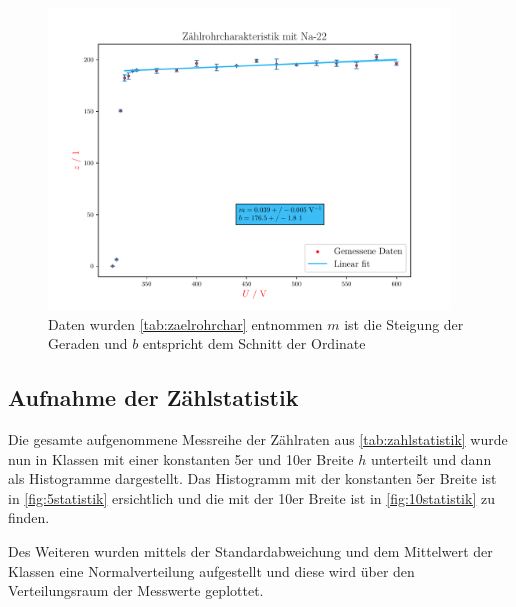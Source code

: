\documentclass[12pt,english,ngerman]{scrartcl}
\begin{document}
\begin{figure}[H]
  \begin{center}
    \includegraphics[width = 0.95\textwidth]{figures/charakteristik.pdf}
  \end{center}
  \caption{Daten wurden \autoref{tab:zaelrohrchar} entnommen 
  $m$ ist die Steigung der Geraden und $b$ entspricht dem Schnitt der Ordinate}
  \label{fig:zaelrohrchar}
\end{figure}


\subsection{Aufnahme der Zählstatistik}

Die gesamte aufgenommene Messreihe der Zählraten aus
\autoref{tab:zahlstatistik} wurde nun in Klassen mit einer konstanten 5er und
10er Breite $h$ unterteilt und dann als Histogramme dargestellt. Das Histogramm
mit der konstanten 5er Breite ist in \autoref{fig:5statistik} ersichtlich und
die mit der 10er Breite ist in \autoref{fig:10statistik} zu finden.

Des Weiteren wurden mittels der Standardabweichung und dem Mittelwert der
Klassen eine Normalverteilung aufgestellt und diese wird über den
Verteilungsraum der Messwerte geplottet.
\end{document}
